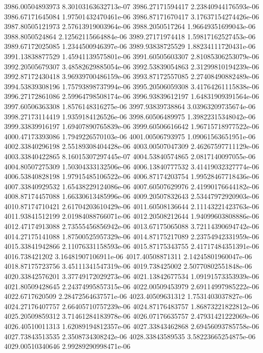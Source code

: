{3986.00504893973 8.30103163632713e-07
3986.27171594417 2.23840944176593e-06
3986.67171645084 1.97501432470461e-06
3986.87171670417 3.17637154274426e-06
3987.80505121973 2.57613919003964e-06
3988.2050517264 1.96649351699043e-06
3988.8050524864 2.12562115664884e-06
3989.27171974418 1.59817162527453e-06
3989.67172025085 1.2344500946397e-06
3989.93838725529 1.88234111720431e-06
3991.13838877529 1.45941139575801e-06
3991.60505603307 2.81085306253079e-06
3992.20505679307 3.48582629885054e-06
3992.53839054863 2.31299810194239e-06
3992.87172430418 3.96939700486159e-06
3993.87172557085 2.27408490882489e-06
3994.53839308196 1.75793898737994e-06
3995.20506059308 3.41764261115838e-06
3996.27172861086 2.59964798508174e-06
3996.93839612197 1.64831909391564e-06
3997.60506363308 1.8576148316275e-06
3997.93839738864 3.03963209735674e-06
3998.27173114419 1.9359184126526e-06
3998.60506489975 1.39822315348042e-06
3999.33839916197 1.69407890765839e-06
3999.60506616642 1.96715718977522e-06
4000.47173393086 1.7949226570103e-06
4001.00506793975 1.09061563651951e-06
4002.33840296198 2.55189308404428e-06
4003.00507047309 2.46267597711129e-06
4003.33840422865 8.16015307297445e-07
4004.53840574865 2.0817140097055e-06
4004.80507275309 1.50304333132506e-06
4006.13840777532 3.41419032327774e-06
4006.53840828198 1.97915485106522e-06
4006.87174203754 1.99528467718436e-06
4007.33840929532 1.65438229124086e-06
4007.60507629976 2.41990176644182e-06
4008.87174457088 1.66330613485996e-06
4009.20507832643 2.53447972920903e-06
4010.87174710421 2.61704203610429e-06
4011.60508136644 2.11143221423763e-06
4011.93841512199 2.01984088766071e-06
4012.20508212644 1.94099603808886e-06
4012.47174913088 2.73555456856942e-06
4013.67175065088 3.72114390694742e-06
4014.27175141088 1.87500525957329e-06
4014.87175217089 2.23754942331959e-06
4015.33841942866 2.11076331158593e-06
4015.87175343755 2.41717484351391e-06
4016.738421202 3.16481907106911e-06
4017.40508871311 2.14245801960047e-06
4018.87175723756 3.45111341547319e-06
4019.738425002 2.50770802551848e-06
4020.33842576201 3.37749172029273e-06
4021.13842677534 1.09191573353939e-06
4021.80509428645 2.24374995857315e-06
4022.00509453979 2.69114997985222e-06
4022.6717620509 2.28472564637571e-06
4023.40509631312 1.7531403037827e-06
4024.27176407757 2.66405710757239e-06
4024.87176483757 1.86873221822812e-06
4025.20509859312 3.71461284183978e-06
4026.07176635757 2.47931421222069e-06
4026.40510011313 1.62089194812357e-06
4027.33843462868 2.69456093785758e-06
4027.73843513535 2.3508734308242e-06
4028.33843589535 3.58223665254875e-06
4029.00510340646 2.99289290998471e-06
}
